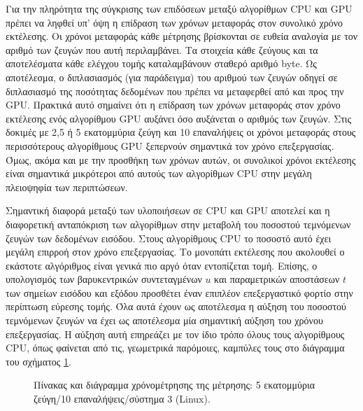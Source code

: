 Για την πληρότητα της σύγκρισης των επιδόσεων μεταξύ αλγορίθμων CPU και GPU πρέπει να ληφθεί υπ' όψη η επίδραση των χρόνων μεταφοράς στον συνολικό χρόνο εκτέλεσης. Οι χρόνοι μεταφοράς κάθε μέτρησης βρίσκονται σε ευθεία αναλογία με τον αριθμό των ζευγών που αυτή περιλαμβάνει. Τα στοιχεία κάθε ζεύγους και τα αποτελέσματα κάθε ελέγχου τομής καταλαμβάνουν σταθερό αριθμό byte. Ως αποτέλεσμα, ο διπλασιασμός (για παράδειγμα) του αριθμού των ζευγών οδηγεί σε διπλασιασμό της ποσότητας δεδομένων που πρέπει να μεταφερθεί από και προς την GPU. Πρακτικά αυτό σημαίνει ότι η επίδραση των χρόνων μεταφοράς στον χρόνο εκτέλεσης ενός αλγορίθμου GPU αυξάνει όσο αυξάνεται ο αριθμός των ζευγών. Στις δοκιμές με 2,5 ή 5 εκατομμύρια ζεύγη και 10 επαναλήψεις οι χρόνοι μεταφοράς στους περισσότερους αλγορίθμους GPU ξεπερνούν σημαντικά τον χρόνο επεξεργασίας. Όμως, ακόμα και με την προσθήκη των χρόνων αυτών, οι συνολικοί χρόνοι εκτέλεσης είναι σημαντικά μικρότεροι από αυτούς των αλγορίθμων CPU στην μεγάλη πλειοψηφία των περιπτώσεων.

Σημαντική διαφορά μεταξύ των υλοποιήσεων σε CPU και GPU αποτελεί και η διαφορετική ανταπόκριση των αλγορίθμων στην μεταβολή του ποσοστού τεμνόμενων ζευγών των δεδομένων εισόδου. Στους αλγορίθμους CPU το ποσοστό αυτό έχει μεγάλη επιρροή στον χρόνο επεξεργασίας. Το μονοπάτι εκτέλεσης που ακολουθεί ο εκάστοτε αλγόριθμος είναι γενικά πιο αργό όταν εντοπίζεται τομή. Επίσης, ο υπολογισμός των βαρυκεντρικών συντεταγμένων $u$ και παραμετρικών αποστάσεων $t$ των σημείων εισόδου και εξόδου προσθέτει έναν επιπλέον επεξεργαστικό φορτίο στην περίπτωση εύρεσης τομής. Όλα αυτά έχουν ως αποτέλεσμα η αύξηση του ποσοστού τεμνόμενων ζευγών να έχει ως αποτέλεσμα μία σημαντική αύξηση του χρόνου επεξεργασίας. Η αύξηση αυτή επηρεάζει με τον ίδιο τρόπο όλους τους αλγορίθμους CPU, όπως φαίνεται από τις, γεωμετρικά παρόμοιες, καμπύλες τους στο διάγραμμα του σχήματος \ref{gpuexample}. 

\begin{figure}[h!]
\begin{center}
\tabcolsep=0.11cm
\scalebox{0.6}{}
\scalebox{0.9}{
}\end{center}
\caption{Πίνακας και διάγραμμα χρόνομέτρησης της μέτρησης: 5 εκατομμύρια ζεύγη/10 επαναλήψεις/σύστημα 3 (Linux).}
\label{gpuexample}
\end{figure}

